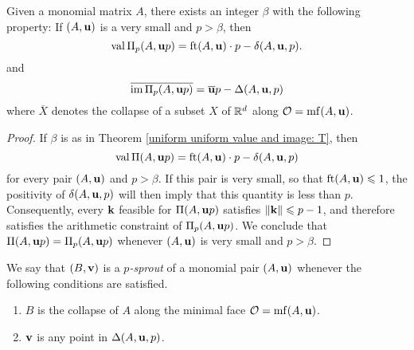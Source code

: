 \documentclass[11pt]{amsart}
\renewcommand{\!}[1]{{\color{red}\text{$\star$\,}#1\,$\star$}}
\newcommand{\ol}[1]{\overline{#1}}
\begin{document}

\begin{theorem}
\label{arithmetic uniform value and image: T}   Given a monomial matrix $A$, there exists an integer $\beta$ with the following property:  
If $(A, \mathbf{u})$ is a very small and $p > \beta$, then  \[ \operatorname{val} \Pi_p(A, \mathbf{u}p) = \operatorname{ft}(A, \mathbf{u}) \cdot p - \delta(A, \mathbf{u}, p). \] 
and 
\[ \ol{ \im \IP_p(A, \vv{u}p)} = \ol{\vv{u}}p - \Delta(A, \vv{u}, p) \] where $\ol{X}$ denotes the collapse of a subset $X$ of $\mathbb{R}^d$ along $\mathcal{O} = \operatorname{mf}(A, \mathbf{u})$.
\end{theorem}

\begin{proof}  If $\beta$ is as in Theorem \ref{uniform uniform value and image: T}, then \[ \operatorname{val} \Pi(A, \mathbf{u}p) = \operatorname{ft}(A, \mathbf{u}) \cdot p - \delta(A, \mathbf{u}, p) \] for every pair $(A, \mathbf{u})$ and $p > \beta$.  If this pair is very small, so that $\operatorname{ft}(A, \mathbf{u}) \leqslant 1$, the positivity of $\delta(A, \mathbf{u},p)$ will then imply that this quantity is less than $p$.  Consequently, every $\mathbf{k}$ feasible for $\Pi(A, \mathbf{u}p)$ satisfies $\| \mathbf{k} \| \leqslant p-1$, and therefore satisfies the arithmetic constraint of $\Pi_p(A, \mathbf{u}p)$.  We conclude that $\Pi(A, \mathbf{u}p) = \Pi_p(A, \mathbf{u}p)$ whenever $(A, \mathbf{u})$ is very small and $p > \beta$.
\end{proof}



\begin{definition}
\label{p-sprout: D}
We say that $(B, \mathbf{v})$ is a \emph{$p$-sprout} of a monomial pair $(A, \mathbf{u})$ whenever the following conditions are satisfied.
\begin{enumerate}
\item $B$ is the collapse of $A$ along the minimal face $\mathcal{O} = \operatorname{mf}(A, \mathbf{u})$.
\item $\mathbf{v}$ is any point in $\Delta(A, \mathbf{u}, p)$.
\end{enumerate}
\end{definition}
\end{document}

